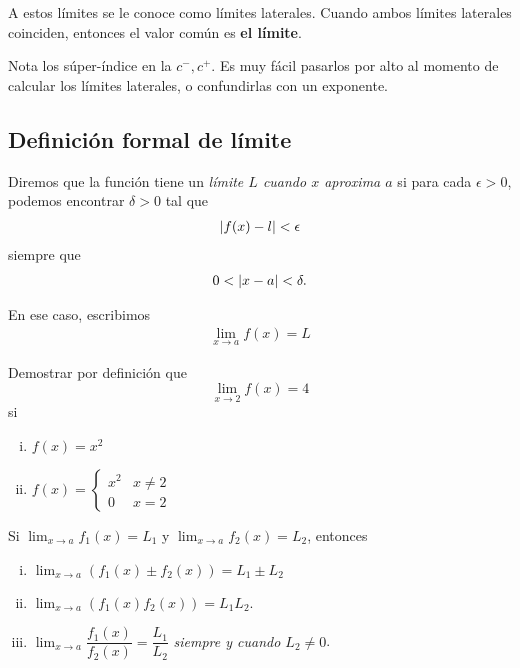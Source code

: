 \begin{observacion}
	A estos límites se le conoce como límites laterales. Cuando ambos límites laterales coinciden, entonces el valor común es \textbf{el límite}.
\end{observacion}

\begin{observacion}
	Nota los súper-índice en la $ c^{-}, c^{+} $. Es muy fácil pasarlos por alto al momento de calcular los límites laterales, o confundirlas con un exponente.
\end{observacion}



\subsection{Definición formal de límite}

\begin{definicion}

	Diremos que la función tiene un \emph{límite $L$ cuando $x$ aproxima $a$} si para cada $\epsilon >0$, podemos encontrar $\delta >0$ tal que
	\begin{align*}
		\left|f(x)-l\right| < \epsilon
	\end{align*}
	siempre que
	\begin{align*}
		0 < \left|x-a\right| < \delta.
	\end{align*}

 En ese caso, escribimos
\begin{align*}
	\lim_{x \to a} f(x) = L
\end{align*}
\end{definicion}


\begin{resuelto}
	Demostrar por definición que $$\lim_{x\to 2}f(x)=4$$ si
	\begin{enumerate}[(i)]
		\item $f(x)=x^{2}$

		\item $f(x)= \begin{cases}
			x^{2} & x\neq 2 \\
			0 & x =2
		\end{cases}$
	\end{enumerate}
\end{resuelto}


\begin{proposicion}

	Si $\lim_{x \to a}f_{1}(x)= L_{1}$ y $\lim_{x \to a }f_{2}(x)= L_{2}$, entonces
	\begin{enumerate}[(i)]
		\item $\lim_{x\to a}\left( f_{1}(x)\pm f_{2}(x) \right) = L_{1}\pm L_{2}$
		\item $\lim_{x\to a}\left( f_{1}(x) f_{2}(x)\right)= L_{1}L_{2}$.
		\item
		$\lim_{x \to a}\dfrac{f_{1}(x)}{f_{2}(x)} = \dfrac{L_{1}}{L_{2}}$
		\emph{siempre y cuando $L_{2}\neq 0$}.
	\end{enumerate}
\end{proposicion}


